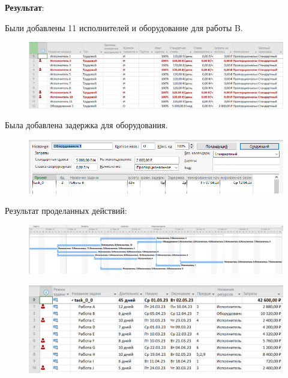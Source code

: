 \textbf{Результат}:

Были добавлены 11 исполнителей и оборудование для работы B.

\begin{figure}[H]
	\begin{center}
		\includegraphics[width=\textwidth]{imgs/task_0_0.png}
	\end{center}
\end{figure}

Была добавлена задержка для оборудования.

\begin{figure}[H]
	\begin{center}
		\includegraphics[width=\textwidth]{imgs/task_0_1.png}
	\end{center}
\end{figure}

Результат проделанных действий:

\begin{figure}[H]
	\begin{center}
		\includegraphics[width=\textwidth]{imgs/task_0_2.png}
	\end{center}
\end{figure}

\begin{figure}[H]
	\begin{center}
		\includegraphics[width=\textwidth]{imgs/task_0_3.png}
	\end{center}
\end{figure}

